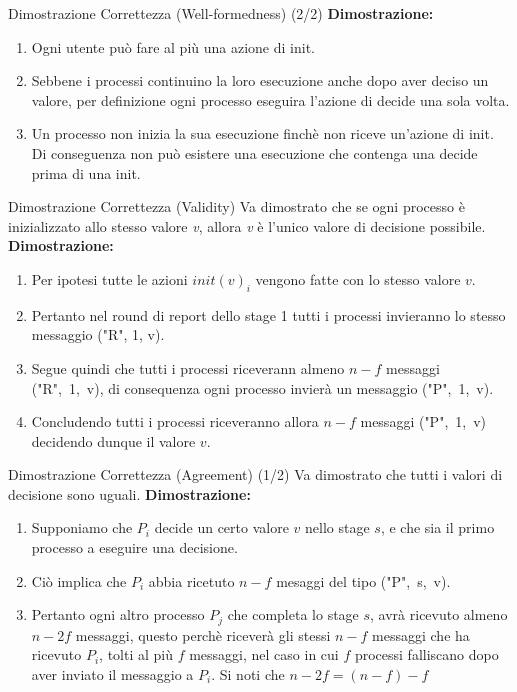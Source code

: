 \documentclass{beamer}
\begin{document}
\begin{frame}{Dimostrazione Correttezza (Well-formedness) (2/2)} %
    \textbf{Dimostrazione:}
    \begin{enumerate}
        \item Ogni utente può fare al più una azione di init.
        \item Sebbene i processi continuino la loro esecuzione anche dopo aver deciso un valore, per definizione ogni processo eseguira l'azione di decide una sola volta.
        \item Un processo non inizia la sua esecuzione finchè non riceve un'azione di init. Di conseguenza non può esistere una esecuzione che contenga una decide prima di una init.
    \end{enumerate}
\end{frame}

\begin{frame}{Dimostrazione Correttezza (Validity)}
    Va dimostrato che se ogni processo è inizializzato allo stesso valore \textit{v}, allora \textit{v} è l'unico valore di decisione possibile.
    \newline \newline
    \textbf{Dimostrazione:}
    \begin{enumerate}
        \item<1-> Per ipotesi tutte le azioni $init(v)_{i}$ vengono fatte con lo stesso valore $v$.
        \item<2-> Pertanto nel round di report dello stage 1 tutti i processi invieranno lo stesso messaggio {("R", 1, v)}.
        \item<3-> Segue quindi che tutti i processi riceverann almeno $n - f$ messaggi \mbox{("R", 1, v)}, di consequenza ogni processo invierà un messaggio \mbox{("P", 1, v)}.
        \item<4-> Concludendo tutti i processi riceveranno allora $n - f$ messaggi \mbox{("P", 1, v)} decidendo dunque il valore $v$.
    \end{enumerate}
\end{frame}

\begin{frame}{Dimostrazione Correttezza (Agreement) (1/2)}
    Va dimostrato che tutti i valori di decisione sono uguali.\newline
    \textbf{Dimostrazione:}
    \begin{enumerate}
        \item<1-> Supponiamo che $P_{i}$ decide un certo valore $v$ nello stage $s$, e che sia il primo processo a eseguire una decisione.
        \item<2-> Ciò implica che $P_{i}$ abbia ricetuto $n - f$ mesaggi del tipo \mbox{("P", s, v)}.
        \item<3-> Pertanto ogni altro processo $P_{j}$ che completa lo stage $s$, avrà ricevuto almeno $n - 2f$
        messaggi, questo perchè riceverà gli stessi $n - f$ messaggi che ha ricevuto $P_{i}$, tolti al più $f$ messaggi, nel caso in cui $f$ processi falliscano dopo aver inviato il messaggio a $P_{i}$. Si noti che $n - 2f = (n - f) - f$
    \end{enumerate}
\end{frame}
\end{document}

